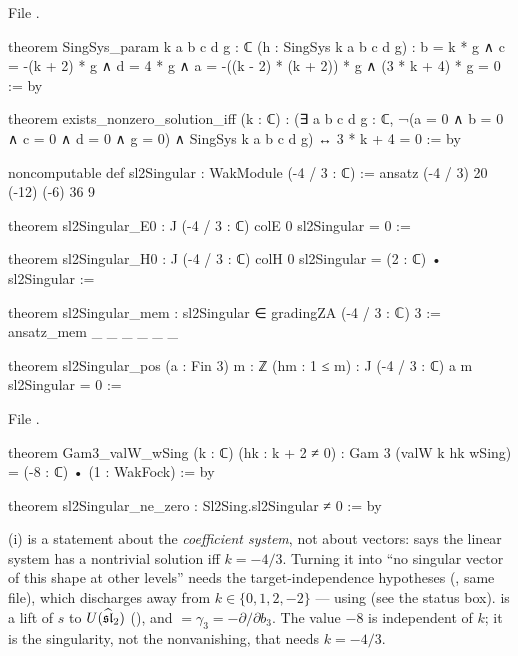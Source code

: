 \noindent File .
\begin{leancode}
theorem SingSys_param {k a b c d g : ℂ} (h : SingSys k a b c d g) :
    b = k * g ∧ c = -(k + 2) * g ∧ d = 4 * g ∧ a = -((k - 2) * (k + 2)) * g
      ∧ (3 * k + 4) * g = 0 := by

theorem exists_nonzero_solution_iff (k : ℂ) :
    (∃ a b c d g : ℂ, ¬(a = 0 ∧ b = 0 ∧ c = 0 ∧ d = 0 ∧ g = 0) ∧ SingSys k a b c d g)
      ↔ 3 * k + 4 = 0 := by

noncomputable def sl2Singular : WakModule (-4 / 3 : ℂ) := ansatz (-4 / 3) 20 (-12) (-6) 36 9

theorem sl2Singular_E0 : J (-4 / 3 : ℂ) colE 0 sl2Singular = 0 :=

theorem sl2Singular_H0 : J (-4 / 3 : ℂ) colH 0 sl2Singular = (2 : ℂ) • sl2Singular :=

theorem sl2Singular_mem : sl2Singular ∈ gradingZA (-4 / 3 : ℂ) 3 := ansatz_mem _ _ _ _ _ _

theorem sl2Singular_pos (a : Fin 3) {m : ℤ} (hm : 1 ≤ m) :
    J (-4 / 3 : ℂ) a m sl2Singular = 0 :=
\end{leancode}
\noindent File .
\begin{leancode}
theorem Gam3_valW_wSing (k : ℂ) (hk : k + 2 ≠ 0) :
    Gam 3 (valW k hk wSing) = (-8 : ℂ) • (1 : WakFock) := by

theorem sl2Singular_ne_zero : Sl2Sing.sl2Singular ≠ 0 := by
\end{leancode}

\begin{dictionary}
(i) is a statement about the \emph{coefficient system}, not about vectors: \allowbreak{}\allowbreak{}\allowbreak{}
says the linear system has a nontrivial solution iff $k=-4/3$. Turning it into ``no singular vector of
this shape at other levels'' needs the target-independence hypotheses (\allowbreak{}\allowbreak{}\allowbreak{}\allowbreak{}\allowbreak{},
same file), which  discharges away from $k\in\{0,1,2,-2\}$ --- using
 (see the status box).  is a lift of $s$ to $U(\widehat{\mathfrak{sl}}_2)$ (),
and  $=\gamma_3 = -\partial/\partial b_3$. The value $-8$ is independent of $k$; it is the
singularity, not the nonvanishing, that needs $k=-4/3$.
\end{dictionary}

